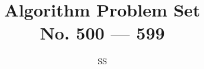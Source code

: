 \documentclass[a4paper,12pt]{article}
\title{Algorithm Problem Set \\ \large No. 500 --- 599}
\author{SS}
\begin{document}
\def\bottom#1#2{\hbox{\vbox to #1{\vfill\hbox{#2}}}}
\renewcommand{\thelstlisting}{\thesection.\arabic{lstlisting}}
\newcommand{\fcc}[1]{\lstinline[language=C++, basicstyle=\small\ttfamily, keywordstyle=\bfseries\color{green!40!black}]|#1|}
\newcommand{\fcj}[1]{\lstinline[language=Java, basicstyle=\small\ttfamily, keywordstyle=\bfseries\color{green!40!black}]|#1|}
\sloppy
\maketitle
%
%
%
%
%
%
%
%
%
%

%
%
%
%
%
%
%
%
%
%
%
%
%
%
%
%

%
%
%
%
%
%
%
%
%
%
%
%
%
%
%
%
%
%
%
%
%

%
%
%
%
%
%
%
%
%
%
%
%
%
%
%

%
%
%
%
%
%
%
%
%
%
%
%
%
%
%
%
%
%
%
%
%








%
%
%


\end{document}
